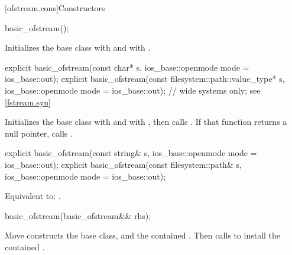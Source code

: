 [ofstream.cons]{Constructors}

%
\begin{itemdecl}
basic_ofstream();
\end{itemdecl}

\begin{itemdescr}
\pnum
\effects
Initializes the base class with
and  with
.
\end{itemdescr}

%
\begin{itemdecl}
explicit basic_ofstream(const char* s,
                        ios_base::openmode mode = ios_base::out);
explicit basic_ofstream(const filesystem::path::value_type* s,
                        ios_base::openmode mode = ios_base::out); // wide systems only; see \ref{fstream.syn}
\end{itemdecl}

\begin{itemdescr}
\pnum
\effects
Initializes the base class with
and  with
,
then calls
.
If that function returns a null pointer, calls
.
\end{itemdescr}

%
\begin{itemdecl}
explicit basic_ofstream(const string& s,
                        ios_base::openmode mode = ios_base::out);
explicit basic_ofstream(const filesystem::path& s,
                        ios_base::openmode mode = ios_base::out);
\end{itemdecl}

\begin{itemdescr}
\pnum
\effects
Equivalent to: .
\end{itemdescr}

%
\begin{itemdecl}
basic_ofstream(basic_ofstream&& rhs);
\end{itemdecl}

\begin{itemdescr}
\pnum
\effects
Move constructs the base class, and the contained .
Then calls 
to install the contained .
\end{itemdescr}

